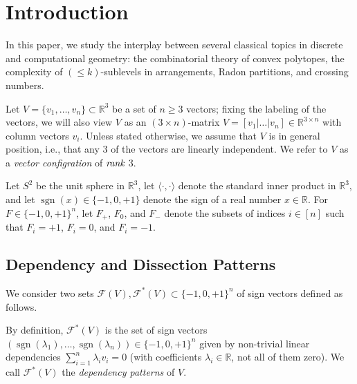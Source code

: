 \documentclass[a4paper,USenglish,cleveref, autoref, thm-restate,nolineno]{socg-lipics-v2021}
\DeclareMathOperator{\sgn}{sgn}
\renewcommand{\leq}{\leqslant}
\renewcommand{\geq}{\geqslant}
\newcommand{\R}{\mathbb{R}}
\begin{document}
\section{Introduction}
\label{s:intro}
In this paper, we study the interplay between several classical topics in discrete and computational geometry: the combinatorial theory of convex polytopes, the complexity of $(\leq k)$-sublevels in arrangements, Radon partitions, and crossing numbers.

Let $V = \{ v_1, \ldots, v_n \} \subset \R^3$ be a set of $n\geq 3$ vectors; fixing the labeling of the vectors, we will also view $V$ as an $(3 \times n)$-matrix $V=[v_1|\dots|v_n] \in \R^{3 \times n}$ with column vectors $v_i$. Unless stated otherwise, we assume that $V$ is in general position, i.e., that any $3$ of the vectors are linearly independent. We refer to $V$ as a \emph{vector configration} of $\emph{rank}$ $3$. 

Let $S^2$ be the unit sphere in $\R^3$, let $\langle\cdot ,\cdot \rangle$ denote the standard inner product in $\R^3$, and let $\sgn(x)\in \{-1,0,+1\}$ denote the sign of a real number $x\in \R$. 
For $F\in \{-1,0,+1\}^n$, let $F_+$, $F_0$, and $F_-$ denote the subsets of indices $i\in [n]$ such that $F_i=+1$, $F_i=0$, and $F_i=-1$.


\subsection{Dependency and Dissection Patterns}
\label{sec:DepDiss}
We consider two sets $\mathcal{F}(V),\mathcal{F}^*(V) \subset \{-1,0,+1\}^n$ of sign vectors defined as follows. 

By definition, $\mathcal{F}^*(V)$ is the set of sign vectors $(\sgn(\lambda_1),\dots,\sgn(\lambda_n)) \in \{-1,0,+1\}^n$ given by non-trivial linear dependencies $\sum_{i=1}^n \lambda_i v_i=0$ (with coefficients $\lambda_i\in \R$, not all of them zero). We call $\mathcal{F}^*(V)$ the \emph{dependency patterns} of $V$.
\end{document}
